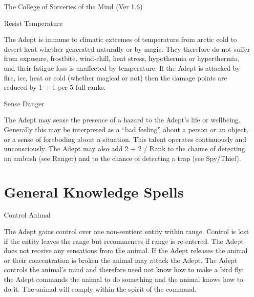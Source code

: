\begin{Chapter}{The College of Sorceries of the Mind (Ver 1.6)}
\begin{talent}[T-2]{Resist Temperature }

\begin{effects}
The Adept is immune to climatic extremes of temperature from arctic
cold to desert heat whether generated naturally or by magic.  They
therefore do not suffer from exposure, frostbite, wind-chill, heat
stress, hypothermia or hyperthermia, and their fatigue loss is
unaffected by temperature.  If the Adept is attacked by fire, ice,
heat or cold (whether magical or not) then the damage points are
reduced by 1 + 1 per 5 full ranks.
\end{effects}
\end{talent}

\begin{talent}[T-3]{Sense Danger }

\begin{effects}
The Adept may sense the presence of a hazard to the Adept’s life or
wellbeing.  Generally this may be interpreted as a “bad feeling” about
a person or an object, or a sense of foreboding about a situation.
This talent operates continuously and unconsciously.  The Adept may
also add 2 + 2 / Rank to the chance of detecting an ambush (see
Ranger) and to the chance of detecting a trap (see Spy/Thief).
\end{effects}
\end{talent}

\section{General Knowledge Spells}

\begin{spell}[G-1]{Control Animal }

\begin{effects}
The Adept gains control over one non-sentient entity within range.
Control is lost if the entity leaves the range but recommences if
range is re-entered.  The Adept does not receive any sensations from
the animal.  If the Adept releases the animal or their concentration
is broken the animal may attack the Adept.  The Adept controls the
animal’s mind and therefore need not know how to make a bird fly: the
Adept commands the animal to do something and the animal knows how to
do it.  The animal will comply within the spirit of the command.
\end{effects}
\end{spell}


\end{Chapter}
